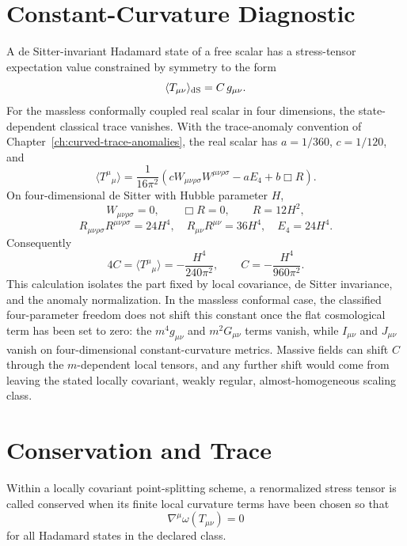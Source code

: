 \section{Constant-Curvature Diagnostic}

A de Sitter-invariant Hadamard state of a free scalar has a stress-tensor
expectation value constrained by symmetry to the form
\[
  \langle T_{\mu\nu}\rangle_{\rm dS}=C\,g_{\mu\nu}.
\]
For the massless conformally coupled real scalar in four dimensions, the
state-dependent classical trace vanishes.  With the trace-anomaly convention
of Chapter~\ref{ch:curved-trace-anomalies}, the real scalar has
\(a=1/360\), \(c=1/120\), and
\[
  \langle T^\mu{}_\mu\rangle
  =
  \frac{1}{16\pi^2}\left(cW_{\mu\nu\rho\sigma}W^{\mu\nu\rho\sigma}
  -aE_4+b\Box R\right).
\]
On four-dimensional de Sitter with Hubble parameter \(H\),
\[
  W_{\mu\nu\rho\sigma}=0,\qquad
  \Box R=0,\qquad
  R=12H^2,
\]
\[
  R_{\mu\nu\rho\sigma}R^{\mu\nu\rho\sigma}=24H^4,\quad
  R_{\mu\nu}R^{\mu\nu}=36H^4,\quad
  E_4=24H^4 .
\]
Consequently
\[
  4C=\langle T^\mu{}_\mu\rangle
  =
  -\frac{H^4}{240\pi^2},
  \qquad
  C=-\frac{H^4}{960\pi^2}.
\]
This calculation isolates the part fixed by local covariance, de Sitter
invariance, and the anomaly normalization.  In the massless conformal case,
the classified four-parameter freedom does not shift this constant once the
flat cosmological term has been set to zero: the \(m^4g_{\mu\nu}\) and
\(m^2G_{\mu\nu}\) terms vanish, while \(I_{\mu\nu}\) and \(J_{\mu\nu}\) vanish
on four-dimensional constant-curvature metrics.  Massive fields can shift
\(C\) through the \(m\)-dependent local tensors, and any further shift would
come from leaving the stated locally covariant, weakly regular,
almost-homogeneous scaling class.

\section{Conservation and Trace}

\begin{definition}
\label{def:conserved-renormalized-stress-tensor-curved}
Within a locally covariant point-splitting scheme, a renormalized stress
tensor is called conserved when its finite local curvature terms have been
chosen so that
\[
  \nabla^\mu\omega(T_{\mu\nu})=0
\]
for all Hadamard states in the declared class.
\end{definition}

